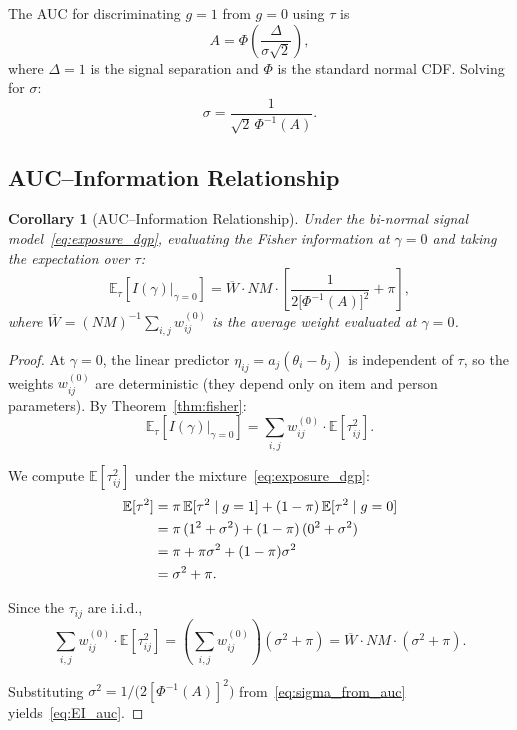 \documentclass[11pt,a4paper]{article}
\newtheorem{corollary}[theorem]{Corollary}
\theoremstyle{definition}
\begin{document}
The AUC for discriminating $g=1$ from $g=0$ using $\tau$ is
\begin{equation}\label{eq:auc_formula}
  A = \Phi\!\left(\frac{\Delta}{\sigma\sqrt{2}}\right),
\end{equation}
where $\Delta = 1$ is the signal separation and
$\Phi$ is the standard normal CDF.
Solving for $\sigma$:
\begin{equation}\label{eq:sigma_from_auc}
  \sigma
  = \frac{1}{\sqrt{2}\,\Phi^{-1}(A)}.
\end{equation}


\subsection{AUC--Information Relationship}

\begin{corollary}[AUC--Information Relationship]\label{cor:auc}
Under the bi-normal signal model~\eqref{eq:exposure_dgp},
evaluating the Fisher information at $\gamma=0$ and taking the
expectation over $\tau$:
\begin{equation}\label{eq:EI_auc}
  \mathbb{E}_\tau\!\left[I(\gamma)\big|_{\gamma=0}\right]
  = \overline{W}\cdot NM\cdot
    \left[\frac{1}{2\bigl[\Phi^{-1}(A)\bigr]^2} + \pi\right],
\end{equation}
where $\overline{W} = (NM)^{-1}\sum_{i,j}w_{ij}^{(0)}$ is the average weight
evaluated at $\gamma=0$.
\end{corollary}

\begin{proof}
At $\gamma=0$, the linear predictor $\eta_{ij}=a_j(\theta_i-b_j)$ is
independent of $\tau$, so the weights $w_{ij}^{(0)}$ are deterministic
(they depend only on item and person parameters).
By Theorem~\ref{thm:fisher}:
\begin{equation}\label{eq:EI_step1}
  \mathbb{E}_\tau\!\left[I(\gamma)\big|_{\gamma=0}\right]
  = \sum_{i,j}w_{ij}^{(0)}\cdot\mathbb{E}[\tau_{ij}^2].
\end{equation}

We compute $\mathbb{E}[\tau_{ij}^2]$ under the mixture~\eqref{eq:exposure_dgp}:
\begin{align}
  \mathbb{E}[\tau^2]
  &= \pi\,\mathbb{E}[\tau^2\mid g=1] + (1-\pi)\,\mathbb{E}[\tau^2\mid g=0]
  \notag\\
  &= \pi\,(1^2+\sigma^2) + (1-\pi)\,(0^2+\sigma^2)
  \notag\\
  &= \pi + \pi\sigma^2 + (1-\pi)\sigma^2
  \notag\\
  &= \sigma^2 + \pi.
  \label{eq:Etau2}
\end{align}

Since the $\tau_{ij}$ are i.i.d.,
\begin{equation}
  \sum_{i,j}w_{ij}^{(0)}\cdot\mathbb{E}[\tau_{ij}^2]
  = \left(\sum_{i,j}w_{ij}^{(0)}\right)(\sigma^2+\pi)
  = \overline{W}\cdot NM\cdot(\sigma^2+\pi).
\end{equation}

Substituting $\sigma^2 = 1/\bigl(2[\Phi^{-1}(A)]^2\bigr)$
from~\eqref{eq:sigma_from_auc} yields~\eqref{eq:EI_auc}.
\end{proof}
\end{document}
